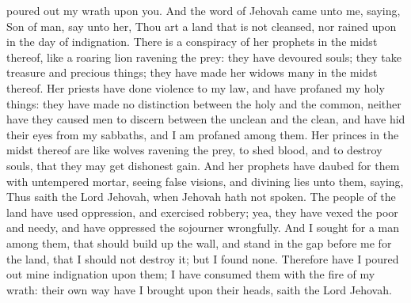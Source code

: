 poured out my wrath upon you.  And the word of Jehovah came unto me, saying, Son of man, say unto her, Thou art a land that is not cleansed, nor rained upon in the day of indignation. There is a conspiracy of her prophets in the midst thereof, like a roaring lion ravening the prey: they have devoured souls; they take treasure and precious things; they have made her widows many in the midst thereof. Her priests have done violence to my law, and have profaned my holy things: they have made no distinction between the holy and the common, neither have they caused men to discern between the unclean and the clean, and have hid their eyes from my sabbaths, and I am profaned among them. Her princes in the midst thereof are like wolves ravening the prey, to shed blood, and to destroy souls, that they may get dishonest gain. And her prophets have daubed for them with untempered mortar, seeing false visions, and divining lies unto them, saying, Thus saith the Lord Jehovah, when Jehovah hath not spoken. The people of the land have used oppression, and exercised robbery; yea, they have vexed the poor and needy, and have oppressed the sojourner wrongfully. And I sought for a man among them, that should build up the wall, and stand in the gap before me for the land, that I should not destroy it; but I found none. Therefore have I poured out mine indignation upon them; I have consumed them with the fire of my wrath: their own way have I brought upon their heads, saith the Lord Jehovah. 

